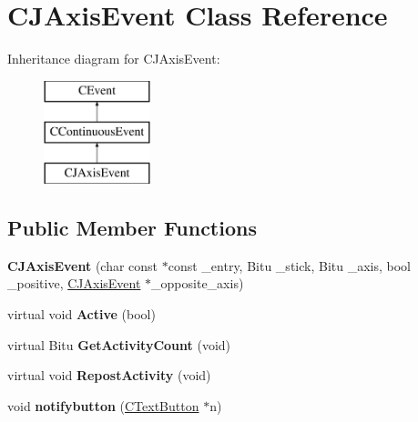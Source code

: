 \hypertarget{classCJAxisEvent}{\section{C\-J\-Axis\-Event Class Reference}
\label{classCJAxisEvent}
}
Inheritance diagram for C\-J\-Axis\-Event\-:\begin{figure}[H]
\begin{center}
\leavevmode
\includegraphics[height=3.000000cm]{classCJAxisEvent}
\end{center}
\end{figure}
\subsection*{Public Member Functions}
\begin{DoxyCompactItemize}
\item 
\hypertarget{classCJAxisEvent_a9cf7657ec986985dd15efcb92b20a380}{{\bfseries C\-J\-Axis\-Event} (char const $\ast$const \-\_\-entry, Bitu \-\_\-stick, Bitu \-\_\-axis, bool \-\_\-positive, \hyperlink{classCJAxisEvent}{C\-J\-Axis\-Event} $\ast$\-\_\-opposite\-\_\-axis)}\label{classCJAxisEvent_a9cf7657ec986985dd15efcb92b20a380}

\item 
\hypertarget{classCJAxisEvent_a1f0618c1d74612e06892430bdf7d8f92}{virtual void {\bfseries Active} (bool)}\label{classCJAxisEvent_a1f0618c1d74612e06892430bdf7d8f92}

\item 
\hypertarget{classCJAxisEvent_af6c1eaff5b1c3f1dc2b2715b76156ea4}{virtual Bitu {\bfseries Get\-Activity\-Count} (void)}\label{classCJAxisEvent_af6c1eaff5b1c3f1dc2b2715b76156ea4}

\item 
\hypertarget{classCJAxisEvent_abc322cf9dcf5488f49cb421f74574968}{virtual void {\bfseries Repost\-Activity} (void)}\label{classCJAxisEvent_abc322cf9dcf5488f49cb421f74574968}

\item 
\hypertarget{classCJAxisEvent_a523cca4f5afb972c28c5aa71ff3f408f}{void {\bfseries notifybutton} (\hyperlink{classCTextButton}{C\-Text\-Button} $\ast$n)}\label{classCJAxisEvent_a523cca4f5afb972c28c5aa71ff3f408f}

\end{DoxyCompactItemize}
